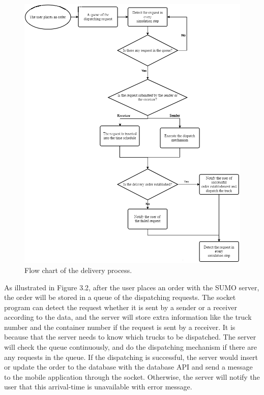 \documentclass[12pt]{ksthesis}
\begin{document}
\begin{thesis}
{\begin{figure}[H]
\centering
\includegraphics[width=1.0\textwidth]{./figures/F3-2_Flowchart.PNG}
\caption{\large Flow chart of the delivery process.}
\vspace{0.5cm}
\label{Fig:flow_chart}
\end{figure}




As illustrated in Figure 3.2, after the user places an order with the SUMO server, the order will be stored in a queue of the dispatching requests. The socket program can detect the request whether it is sent by a sender or a receiver according to the data, and the server will store extra information like the truck number and the container number if the request is sent by a receiver. 
It is because that the server needs to know which trucks to be dispatched. The server will check the queue continuously, and do the dispatching mechanism if there are any requests in the queue. If the dispatching is successful, the server would insert or update the order to the database with the database API and send a message to the mobile application through the socket. Otherwise, the server will notify the user that this arrival-time is unavailable with error message. 

}
\end{thesis}
\end{document}

